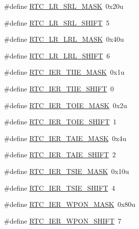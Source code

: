 \begin{DoxyCompactItemize}
$$\item 
\#define \hyperlink{group___r_t_c___register___masks_ga0681f481e213872418c16d5e012e5603}{R\+T\+C\+\_\+\+L\+R\+\_\+\+S\+R\+L\+\_\+\+M\+A\+SK}~0x20u
\item 
\#define \hyperlink{group___r_t_c___register___masks_ga33823f8e5a5e100db14493426af60d67}{R\+T\+C\+\_\+\+L\+R\+\_\+\+S\+R\+L\+\_\+\+S\+H\+I\+FT}~5
\item 
\#define \hyperlink{group___r_t_c___register___masks_gaf57761c6f1eb820b0d6764ae63e7dfcf}{R\+T\+C\+\_\+\+L\+R\+\_\+\+L\+R\+L\+\_\+\+M\+A\+SK}~0x40u
\item 
\#define \hyperlink{group___r_t_c___register___masks_ga723a045710e5df92a5bf5363e8cea08f}{R\+T\+C\+\_\+\+L\+R\+\_\+\+L\+R\+L\+\_\+\+S\+H\+I\+FT}~6
\item 
\#define \hyperlink{group___r_t_c___register___masks_ga4401cd4dce34a638f75403a2a3701e6d}{R\+T\+C\+\_\+\+I\+E\+R\+\_\+\+T\+I\+I\+E\+\_\+\+M\+A\+SK}~0x1u
\item 
\#define \hyperlink{group___r_t_c___register___masks_ga2938c56e7566549f7434b8f02ad6d478}{R\+T\+C\+\_\+\+I\+E\+R\+\_\+\+T\+I\+I\+E\+\_\+\+S\+H\+I\+FT}~0
\item 
\#define \hyperlink{group___r_t_c___register___masks_ga1dfc25308bec00f67925ae796f805d3d}{R\+T\+C\+\_\+\+I\+E\+R\+\_\+\+T\+O\+I\+E\+\_\+\+M\+A\+SK}~0x2u
\item 
\#define \hyperlink{group___r_t_c___register___masks_gaf9355764ec83dde6e2890f391a469856}{R\+T\+C\+\_\+\+I\+E\+R\+\_\+\+T\+O\+I\+E\+\_\+\+S\+H\+I\+FT}~1
\item 
\#define \hyperlink{group___r_t_c___register___masks_gad1bcc4df9a637ec5ab4b611391986c06}{R\+T\+C\+\_\+\+I\+E\+R\+\_\+\+T\+A\+I\+E\+\_\+\+M\+A\+SK}~0x4u
\item 
\#define \hyperlink{group___r_t_c___register___masks_gae15cd7098592da4c3a2c2563879ae5d8}{R\+T\+C\+\_\+\+I\+E\+R\+\_\+\+T\+A\+I\+E\+\_\+\+S\+H\+I\+FT}~2
\item 
\#define \hyperlink{group___r_t_c___register___masks_ga63c8ae5db82845d5bb13907cd0e70cd7}{R\+T\+C\+\_\+\+I\+E\+R\+\_\+\+T\+S\+I\+E\+\_\+\+M\+A\+SK}~0x10u
\item 
\#define \hyperlink{group___r_t_c___register___masks_ga456ec6fb31112c122b38dcc586d9e75d}{R\+T\+C\+\_\+\+I\+E\+R\+\_\+\+T\+S\+I\+E\+\_\+\+S\+H\+I\+FT}~4
\item 
\#define \hyperlink{group___r_t_c___register___masks_gae08d5bcb3d71bb932a7c1d41086b3545}{R\+T\+C\+\_\+\+I\+E\+R\+\_\+\+W\+P\+O\+N\+\_\+\+M\+A\+SK}~0x80u
\item 
\#define \hyperlink{group___r_t_c___register___masks_gaa18422218526a3bb50a3158c3aee2100}{R\+T\+C\+\_\+\+I\+E\+R\+\_\+\+W\+P\+O\+N\+\_\+\+S\+H\+I\+FT}~7
\end{DoxyCompactItemize}


